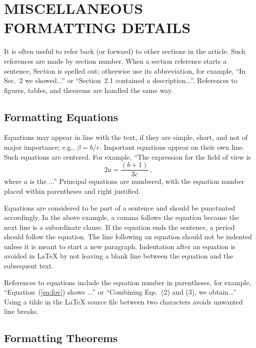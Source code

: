 \documentclass[]{spie}  %
\begin{document}
\appendix    %

\section{MISCELLANEOUS FORMATTING DETAILS}
\label{sec:misc}

It is often useful to refer back (or forward) to other sections in the article.  Such references are made by section number.  When a section reference starts a sentence, Section is spelled out; otherwise use its abbreviation, for example, ``In Sec.~2 we showed...'' or ``Section~2.1 contained a description...''.  References to figures, tables, and theorems are handled the same way.

\subsection{Formatting Equations}
Equations may appear in line with the text, if they are simple, short, and not of major importance; e.g., $\beta = b/r$.  Important equations appear on their own line.  Such equations are centered.  For example, ``The expression for the field of view is
\begin{equation}
\label{eq:fov}
2 a = \frac{(b + 1)}{3c} \, ,
\end{equation}
where $a$ is the ...'' Principal equations are numbered, with the equation number placed within parentheses and right justified.  

Equations are considered to be part of a sentence and should be punctuated accordingly. In the above example, a comma follows the equation because the next line is a subordinate clause.  If the equation ends the sentence, a period should follow the equation.  The line following an equation should not be indented unless it is meant to start a new paragraph.  Indentation after an equation is avoided in LaTeX by not leaving a blank line between the equation and the subsequent text.

References to equations include the equation number in parentheses, for example, ``Equation~(\ref{eq:fov}) shows ...'' or ``Combining Eqs.~(2) and (3), we obtain...''  Using a tilde in the LaTeX source file between two characters avoids unwanted line breaks.

\subsection{Formatting Theorems}
\end{document}
